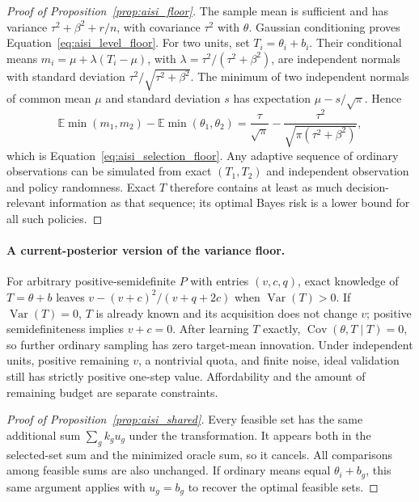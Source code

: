 \begin{proof}[Proof of Proposition~\ref{prop:aisi_floor}]
The sample mean is sufficient and has variance
$\tau^2+\beta^2+r/n$, with covariance $\tau^2$ with $\theta$.
Gaussian conditioning proves Equation~\eqref{eq:aisi_level_floor}.
For two units, set $T_i=\theta_i+b_i$. Their conditional means
$m_i=\mu+\lambda(T_i-\mu)$, with
$\lambda=\tau^2/(\tau^2+\beta^2)$, are independent normals with
standard deviation $\tau^2/\sqrt{\tau^2+\beta^2}$. The minimum of two
independent normals of common mean $\mu$ and standard deviation $s$
has expectation $\mu-s/\sqrt{\pi}$. Hence
\[
 \mathbb E\min(m_1,m_2)-\mathbb E\min(\theta_1,\theta_2)
 =\frac{\tau}{\sqrt\pi}
   -\frac{\tau^2}{\sqrt{\pi(\tau^2+\beta^2)}},
\]
which is Equation~\eqref{eq:aisi_selection_floor}. Any adaptive sequence
of ordinary observations can be simulated from exact $(T_1,T_2)$ and
independent observation and policy randomness. Exact $T$ therefore
contains at least as much decision-relevant information as that sequence;
its optimal Bayes risk is a lower bound for all such policies.
\end{proof}

\paragraph{A current-posterior version of the variance floor.}
For arbitrary positive-semidefinite $P$ with entries $(v,c,q)$, exact
knowledge of $T=\theta+b$ leaves
$v-(v+c)^2/(v+q+2c)$ when $\operatorname{Var}(T)>0$.
If $\operatorname{Var}(T)=0$, $T$ is already known and its acquisition
does not change $v$; positive semidefiniteness implies $v+c=0$.
After learning $T$ exactly, $\operatorname{Cov}(\theta,T\mid T)=0$,
so further ordinary sampling has zero target-mean innovation. Under
independent units, positive remaining $v$, a nontrivial quota, and finite
noise, ideal validation still has strictly positive one-step value.
Affordability and the amount of remaining budget are separate constraints.

\begin{proof}[Proof of Proposition~\ref{prop:aisi_shared}]
Every feasible set has the same additional sum $\sum_g k_g u_g$ under
the transformation. It appears both in the selected-set sum and the
minimized oracle sum, so it cancels. All comparisons among feasible sums
are also unchanged. If ordinary means equal $\theta_i+b_g$, this same
argument applies with $u_g=b_g$ to recover the optimal feasible sets.
\end{proof}

